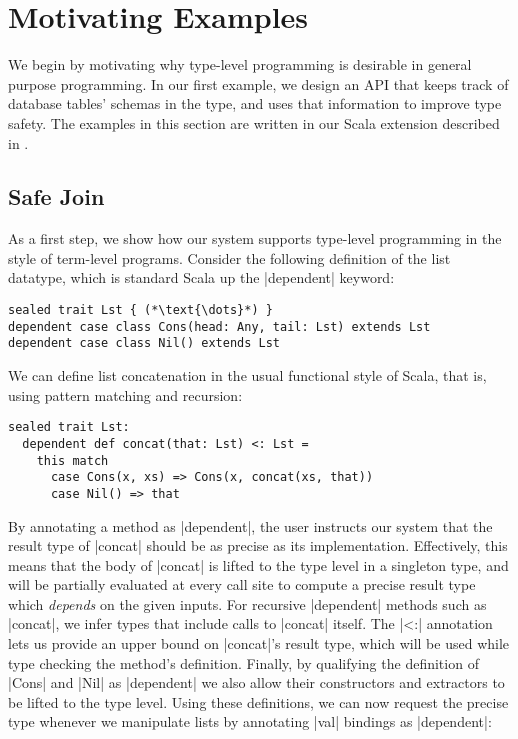 \section{Motivating Examples}
\label{sec:motivating-example}

We begin by motivating why type-level programming is desirable in general purpose programming.
In our first example, we design an API that keeps track of database tables' schemas in the type, and uses that information to improve type safety.
The examples in this section are written in our Scala extension described in .

\subsection{Safe Join}
\label{sec:safe-join}

As a first step, we show how our system supports type-level programming in the style of term-level programs.
Consider the following definition of the list datatype, which is standard Scala up the |dependent| keyword:

\begin{lstlisting}
sealed trait Lst { (*\text{\dots}*) }
dependent case class Cons(head: Any, tail: Lst) extends Lst
dependent case class Nil() extends Lst
\end{lstlisting}

\noindent
We can define list concatenation in the usual functional style of Scala, that is, using pattern matching and recursion:

\begin{lstlisting}
sealed trait Lst:
  dependent def concat(that: Lst) <: Lst =
    this match
      case Cons(x, xs) => Cons(x, concat(xs, that))
      case Nil() => that
\end{lstlisting}

\noindent
By annotating a method as |dependent|, the user instructs our system that the result type of |concat| should be as precise as its implementation.
Effectively, this means that the body of |concat| is lifted to the type level in a singleton type, and will be partially evaluated at every call site to compute a precise result type which \emph{depends} on the given inputs.
For recursive |dependent| methods such as |concat|, we infer types that include calls to |concat| itself.
The |<:| annotation lets us provide an upper bound on |concat|'s result type, which will be used while type checking the method's definition.
Finally, by qualifying the definition of |Cons| and |Nil| as |dependent| we also allow their constructors and extractors to be lifted to the type level.
Using these definitions, we can now request the precise type whenever we manipulate lists by annotating |val| bindings as |dependent|:

